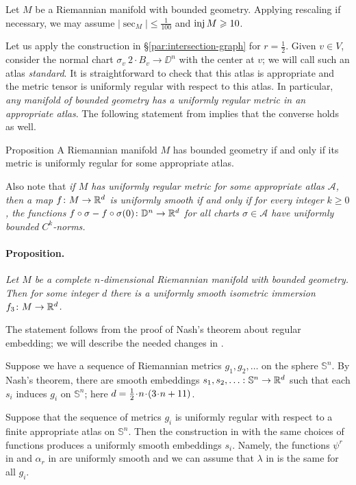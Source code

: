 \documentclass[a4paper,10pt]{article}
\begin{document}
Let $M$ be a Riemannian manifold with bounded geometry.
Applying rescaling if necessary, we may assume $|\sec_M|\le \tfrac1{100}$ and $\operatorname{\rm inj} M\geqslant 10$.

Let us apply the construction in §\ref{par:intersection-graph} for $r=\tfrac12$.
Given $v\in V$, consider the normal chart $\sigma_v\:2\cdot B_v\to\DD^n$ with the center at $v$;
we will call such an atlas \emph{standard}.
It is straightforward to check that this atlas is appropriate and
the metric tensor is uniformly regular with respect to this atlas.
In particular, \textit{any manifold of bounded geometry has a uniformly regular metric in an appropriate atlas}.
The following statement from \cite{disconzi-shao-simonett} implies that the converse holds as well.

\begin{thm}{Proposition}
A Riemannian manifold $M$ has bounded geometry if and only if its metric is uniformly regular for some appropriate atlas.
\end{thm}

Also note that \textit{if $M$ has uniformly regular metric for some appropriate atlas $\mathcal{A}$,
then a map $f\colon M\to \mathbb{R}^d$ is uniformly smooth if and only if for every integer $k\ge 0$,
the functions $f\circ\sigma-f\circ\sigma(0)\colon \mathbb{D}^n\to \mathbb{R}^d$ for all charts $\sigma\in \mathcal{A}$
have uniformly bounded $C^k$-norms.}


\paragraph{Proposition.}\label{par:nash}
\textit{Let $M$ be a complete $n$-dimensional Riemannian manifold with bounded geometry.
Then for some integer $d$ there is a uniformly smooth isometric immersion $f_3\colon M\to\mathbb{R}^d$.}

\medskip

The statement follows from the proof of Nash's theorem about regular embedding;
we will describe the needed changes in \cite{nash}.

Suppose we have a sequence of Riemannian metrics $g_1,g_2,\dots $ on the sphere $\mathbb{S}^n$.
By Nash's theorem, there are smooth embeddings $s_1,s_2,\z\dots\:\mathbb{S}^n\to \RR^d$
such that each $s_i$ induces $g_i$ on $\mathbb{S}^n$; here $d\z=\tfrac12\cdot n\cdot(3\cdot n+11)$.

Suppose that the sequence of metrics $g_i$ is uniformly regular with respect to a finite appropriate atlas on $\mathbb{S}^n$.
Then the construction in \cite[Part C]{nash} with the same choices of functions produces a uniformly smooth embeddings $s_i$.
Namely, the functions $\psi^r$ in \cite[(C2)]{nash} and $\alpha_r$ in \cite[(C10)]{nash} are uniformly smooth and we can assume that $\lambda$ in \cite[(C12)]{nash} is the same for all $g_i$. 
\end{document}
